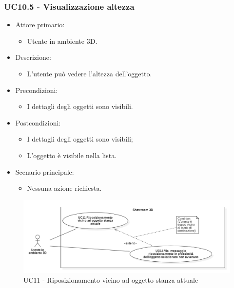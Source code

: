 \subsubsection{UC10.5 - Visualizzazione altezza}
\begin{itemize}

	\item Attore primario: 
	\begin{itemize}
		\item Utente in ambiente 3D.
	\end{itemize}
	\item Descrizione:
	\begin{itemize}
		\item L'utente può vedere l'altezza dell'oggetto.
	\end{itemize}
	
	\item Precondizioni:
	\begin{itemize}
		\item I dettagli degli oggetti sono visibili.
	\end{itemize}
	
	\item Postcondizioni:
	\begin{itemize}
		\item  I dettagli degli oggetti sono visibili;
		\item L'oggetto è visibile nella lista.
	\end{itemize}
	
	\item Scenario principale:
	\begin{itemize}
		\item Nessuna azione richiesta.
	\end{itemize}
	
\end{itemize}

\pagebreak

\begin{figure}[H]
  \renewcommand{\thefigure}{13}
  \includegraphics[width=\linewidth]{./res/images/UC11-14.png}
  \caption{UC11 - Riposizionamento vicino ad oggetto stanza attuale}
  \label{fig:UC 11 e UC14}
\end{figure}

